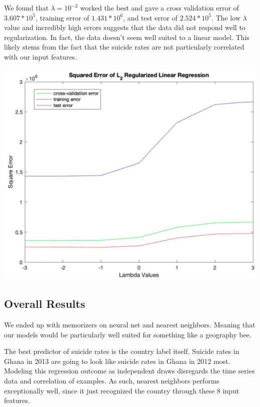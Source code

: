 \documentclass{article}
\begin{document}
\begin{multicols}{2}
We found that $\lambda = 10^{-2}$ worked the best and gave a cross validation error of $3.607 * 10^5$, training error of $1.431* 10^6$, and test error of $2.524 * 10^5$. The low $\lambda$ value and incredibly high errors suggests that the data did not respond well to regularization. In fact, the data doesn't seem well suited to a linear model. This likely stems from the fact that the suicide rates are not particularly correlated with our input features. 

\begingroup
    \includegraphics[width=\columnwidth]{lin_reg.png}
    \begin{spacing}{1.2}
    \label{fig:lin_reg_model} 
	\end{spacing}
\endgroup

\subsection{Overall Results}

We ended up with memorizers on neural net and nearest neighbors. Meaning that our models would be particularly well suited for something like a geography bee. 


The best predictor of suicide rates is the country label itself. Suicide rates in Ghana in 2013 are going to look like suicide rates in Ghana in 2012 most. Modeling this regression outcome as independent draws disregards the time series data and correlation of examples. As such, nearest neighbors performs exceptionally well, since it just recognized the country through these 8 input features. 


\end{multicols}
\end{document}
